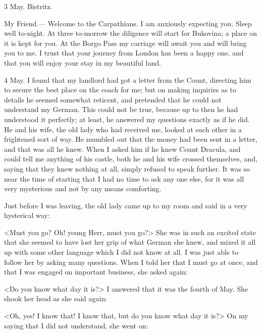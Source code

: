 \begin{diary}{3 May. Bistritz.}
\begin{mail}{}{My Friend.—}
Welcome to the Carpathians. I am anxiously expecting you. Sleep well to-night. At three to-morrow the diligence will start for Bukovina; a place on it is kept for you. At the Borgo Pass my carriage will await you and will bring you to me. I trust that your journey from London has been a happy one, and that you will enjoy your stay in my beautiful land.

\end{mail}

\end{diary}

\begin{diary}{4 May.}	
I found that my landlord had got a letter from the Count, directing him to secure the best place on the coach for me; but on making inquiries as to details he seemed somewhat reticent, and pretended that he could not understand my German. This could not be true, because up to then he had understood it perfectly; at least, he answered my questions exactly as if he did. He and his wife, the old lady who had received me, looked at each other in a frightened sort of way. He mumbled out that the money had been sent in a letter, and that was all he knew. When I asked him if he knew Count Dracula, and could tell me anything of his castle, both he and his wife crossed themselves, and, saying that they knew nothing at all, simply refused to speak further. It was so near the time of starting that I had no time to ask any one else, for it was all very mysterious and not by any means comforting.

Just before I was leaving, the old lady came up to my room and said in a very hysterical way:

<Must you go? Oh! young Herr, must you go?> She was in such an excited state that she seemed to have lost her grip of what German she knew, and mixed it all up with some other language which I did not know at all. I was just able to follow her by asking many questions. When I told her that I must go at once, and that I was engaged on important business, she asked again:

<Do you know what day it is?> I answered that it was the fourth of May. She shook her head as she said again:

<Oh, yes! I know that! I know that, but do you know what day it is?> On my saying that I did not understand, she went on:


\end{diary}

